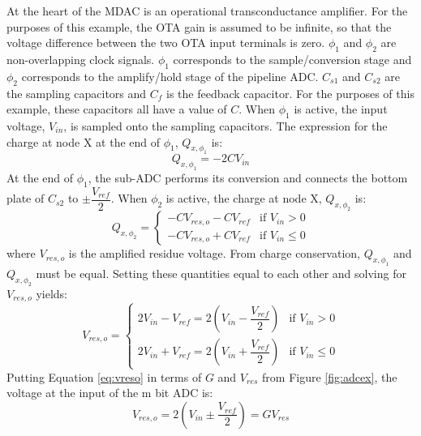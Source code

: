 At the heart of the MDAC is an operational transconductance amplifier. For the purposes of this example, the OTA gain is assumed to be infinite, so that the voltage difference between the two OTA input terminals is zero. $\phi_1$ and $\phi_{2}$ are non-overlapping clock signals. $\phi_1$ corresponds to the sample/conversion stage and $\phi_2$ corresponds to the amplify/hold stage of the pipeline ADC. $C_{s1}$ and $C_{s2}$ are the sampling capacitors and $C_{f}$ is the feedback capacitor. For the purposes of this example, these capacitors all have a value of $C$. When $\phi_1$ is active, the input voltage, $V_{in}$, is sampled onto the sampling capacitors. The expression for the charge at node X at the end of $\phi_{1}$, $Q_{x,\phi_{1}}$ is:
\begin{equation}
\label{qxphi1}
Q_{x,\phi_{1}}=-2CV_{in}
\end{equation}
At the end of $\phi_{1}$, the sub-ADC performs its conversion and connects the bottom plate of $C_{s2}$ to $\pm \dfrac{V_{ref}}{2}$. When $\phi_{2}$ is active, the charge at node X, $Q_{x,\phi_{2}}$ is:
\begin{equation}
\label{qxphi2}
Q_{x,\phi_{2}}=
	\begin{cases}
		-CV_{res,o}-CV_{ref} & \mbox{if } V_{in} > 0 \\
		-CV_{res,o}+CV_{ref} & \mbox{if } V_{in} \leq 0
	\end{cases}
\end{equation}
where $V_{res,o}$ is the amplified residue voltage. From charge conservation, $Q_{x,\phi_{1}}$ and $Q_{x,\phi_{2}}$ must be equal. Setting these quantities equal to each other and solving for $V_{res,o}$ yields:
\begin{equation}
\label{eq:vreso} 
V_{res,o}= 
	\begin{cases} 
		2V_{in}-V_{ref} = 2(V_{in}-\dfrac{V_{ref}}{2}) & \mbox{if } V_{in} > 0 \\[0.5em]
		2V_{in}+V_{ref} = 2(V_{in}+\dfrac{V_{ref}}{2}) & \mbox{if } V_{in} \leq 0
	\end{cases}
\end{equation} 
Putting Equation \ref{eq:vreso} in terms of $G$ and $V_{res}$ from Figure \ref{fig:adcex}, the voltage at the input of the m bit ADC is:
\begin{equation}
\label{eq:vresoadcex}
V_{res,o}=2(V_{in}\pm\dfrac{V_{ref}}{2})=GV_{res}
\end{equation}

